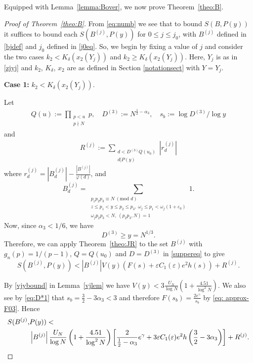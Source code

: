 \documentclass[12pt]{amsart}
\begin{document}
Equipped with Lemma~\ref{lemma:Bover}, we now prove Theorem~\ref{theo:B}.
\begin{proof}[Proof of Theorem~\ref{theo:B}]
From \eqref{eq:numb} we see that to bound $S(B,P(y))$ it suffices to bound each $S(B^{(j)},P(y))$ for $0\le j\le j_0$, with $B^{(j)}$ defined in \eqref{bjdef} and $j_0$ defined in \eqref{j0eq}. So, we begin by fixing a value of $j$ and consider the two cases $k_2< K_{\delta}(x_2(Y_j))$ and $k_2\ge K_{\delta}(x_2(Y_j))$. Here, $Y_j$ is as in \eqref{zjyj} and $k_2$, $K_{\delta}$, $x_2$ are as defined in Section \ref{notationsect} with $Y=Y_j$.
\newline

\noindent\textbf{Case 1:} $k_2< K_{\delta}(x_2(Y_j))$.

Let
\begin{align}
\label{eq:D*1}
Q(u):=\prod_{\substack{p< u\\p\nmid N}} p,\quad D^{(3)}:=N^{\frac{1}{2}-\alpha_3},\quad s_b:=\log D^{(3)}/\log y
\end{align}
and 
\begin{align*}
R^{(j)}:=\sum_{\substack{d<D^{(3)}Q(u_0)\\d|P(y)}} \left|r_d^{(j)}\right|
\end{align*}
where $r_d^{(j)}=\left|B_d^{(j)}\right|-\frac{|B^{(j)}|}{\varphi(d)}$, and
\begin{equation*}
    B_d^{(j)}=\sum_{\substack{p_1p_2p_3\equiv N\: (\text{mod }d) \\ z\le p_1<y\le p_2\le p_3,~\omega_j\le p_1<\omega_j(1+\varepsilon_0) \\\omega_jp_2p_3<N,~(p_2p_3,N)=1 }} 1.
\end{equation*}
Now, since $\alpha_3<1/6$, we have
\begin{equation*}
D^{(3)}\ge y=N^{1/3}.
\end{equation*} 
Therefore, we can apply Theorem~\ref{theo:JR} to the set $B^{(j)}$ with $g_n(p)=1/(p-1)$, $Q=Q(u_0)$ and $D=D^{(3)}$ in \eqref{suppereq} to give
\begin{equation*}
S(B^{(j)}, P(y)) <\left|B^{(j)}\right|V(y)(F(s)+\varepsilon C_{1}(\varepsilon) e^2h(s))+R^{(j)}.
\end{equation*}

By \eqref{vjybound} in Lemma~\ref{vjlem} we have $V(y)< 3\frac{U_N}{\log N}\left( 1+\frac{4.51}{\log^2N}\right)$. We also see by \eqref{eq:D*1} that $s_b=\frac{3}{2}-3\alpha_3< 3$ and therefore $F(s_b)=\frac{2e^{\gamma}}{s_b}$ by \eqref{eq: approx-F03}. Hence
\begin{align}\label{bjfirst}
S(B^{(j)},& P(y)) <\\  &\left|B^{(j)}\right|\frac{U_N}{\log N}\left( 1+\frac{4.51}{\log^2N}\right)\left[\frac{2}{\frac{1}{2}-\alpha_3} e^{\gamma}+3\varepsilon C_{1}(\varepsilon) e^2h\left(\frac{3}{2}-3\alpha_3\right)\right]+R^{(j)}.\notag
\end{align}


\end{proof}
\end{document}
